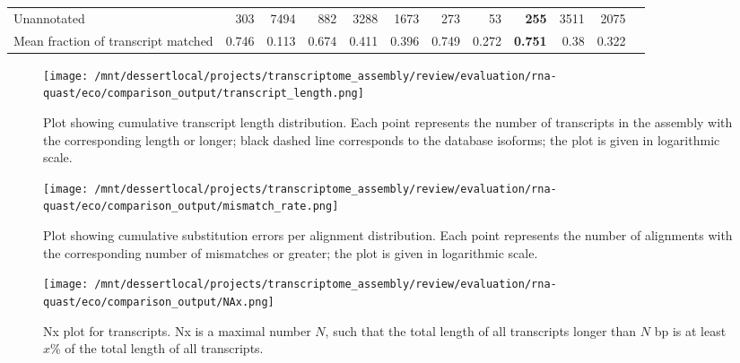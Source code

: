 \documentclass[12pt,a4paper]{article}
\begin{document}
\begin{table}[t]
\begin{adjustbox}{width=1\textwidth}
\begin{tabular}{|l*{11}{|r}|}
Unannotated                                             & 303                    & 7494                   & 882                    & 3288                   & 1673                   & 273                    & 53                     & \textbf{255}           & 3511                   & 2075                   \\
Mean fraction of transcript matched                     & 0.746                  & 0.113                  & 0.674                  & 0.411                  & 0.396                  & 0.749                  & 0.272                  & \textbf{0.751}         & 0.38                   & 0.322                  \\ \hline
\end{tabular}
\end{adjustbox}
\end{table}

\FloatBarrier
\clearpage
{}

\begin{figure}[t]
\centering
\texttt{[image: /mnt/dessertlocal/projects/transcriptome\_assembly/review/evaluation/rna-quast/eco/comparison\_output/transcript\_length.png]}
\caption{Plot showing cumulative transcript length distribution. Each point represents the number of transcripts in the assembly with the corresponding length or longer; black dashed line corresponds to the database isoforms; the plot is given in logarithmic scale.}
\end{figure}
\FloatBarrier
\clearpage


\begin{figure}[t]
\centering
\texttt{[image: /mnt/dessertlocal/projects/transcriptome\_assembly/review/evaluation/rna-quast/eco/comparison\_output/mismatch\_rate.png]}
\caption{Plot showing cumulative substitution errors per alignment distribution. Each point represents the number of alignments with the corresponding number of mismatches or greater; the plot is given in logarithmic scale.}
\end{figure}
\FloatBarrier
\clearpage


\begin{figure}[t]
\centering
\texttt{[image: /mnt/dessertlocal/projects/transcriptome\_assembly/review/evaluation/rna-quast/eco/comparison\_output/NAx.png]}
\caption{Nx plot for transcripts. Nx is a maximal number $N$, such that the total length of all transcripts longer than $N$ bp is at least $x\%$ of the total length of all transcripts.}
\end{figure}
\FloatBarrier
\clearpage
\end{document}
